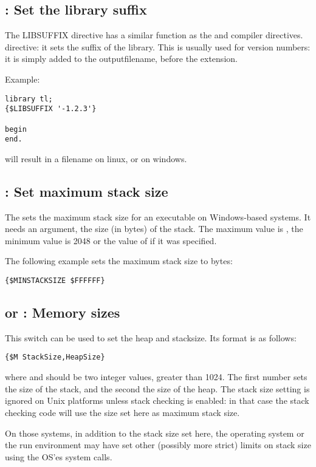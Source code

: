 \subsection{ : Set the library suffix}
The LIBSUFFIX directive has a similar function as the  and
 compiler directives. directive: it sets the suffix of the 
library. This is usually used for version numbers: it is simply added to the 
outputfilename, before the extension.

Example:
\begin{verbatim}
library tl;
{$LIBSUFFIX '-1.2.3'}

begin
end.
\end{verbatim}
will result in a filename  on linux, or
 on windows.

\subsection{ : Set maximum stack size}
The  sets the maximum stack size for an executable
on Windows-based systems. It needs an argument, the size (in bytes) of the
stack. The maximum value is , the minimum value is 2048 or the
value of  if it was specified.

The following example sets the maximum stack size to bytes:
\begin{verbatim}
{$MINSTACKSIZE $FFFFFF}
\end{verbatim}

\subsection{ or  : Memory sizes}

This switch can be used to set the heap and stacksize. Its format is as
follows:
\begin{verbatim}
{$M StackSize,HeapSize}
\end{verbatim}
where  and  should be two integer values,
greater than 1024. The first number sets the size of the stack, and the
second the size of the heap. The stack size setting is ignored on Unix
platforms unless stack checking is enabled: in that case the
stack checking code will use the size set here as maximum stack size.

On those systems, in addition to the stack size set here, the operating
system or the run environment may have set other (possibly more strict) 
limits on stack size using the OS'es  system calls.

